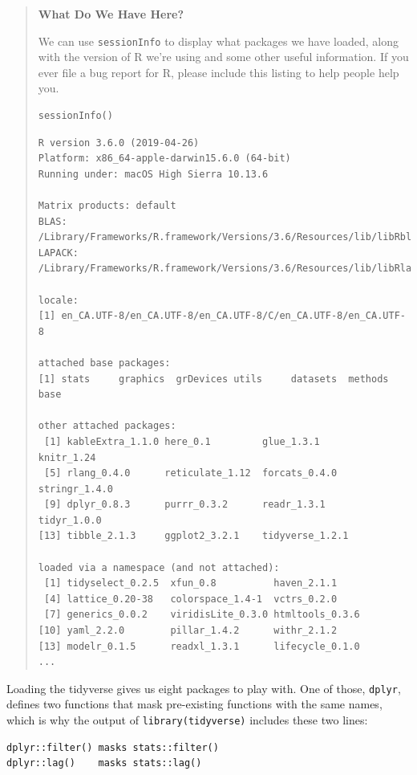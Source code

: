 \begin{quote}
\textbf{What Do We Have Here?}

We can use \texttt{sessionInfo} to display what packages we have loaded,
along with the version of R we're using and some other useful information.
If you ever file a bug report for R,
please include this listing to help people help you.

\begin{lstlisting}
sessionInfo()
\end{lstlisting}

\begin{lstlisting}
R version 3.6.0 (2019-04-26)
Platform: x86_64-apple-darwin15.6.0 (64-bit)
Running under: macOS High Sierra 10.13.6

Matrix products: default
BLAS:   /Library/Frameworks/R.framework/Versions/3.6/Resources/lib/libRblas.0.dylib
LAPACK: /Library/Frameworks/R.framework/Versions/3.6/Resources/lib/libRlapack.dylib

locale:
[1] en_CA.UTF-8/en_CA.UTF-8/en_CA.UTF-8/C/en_CA.UTF-8/en_CA.UTF-8

attached base packages:
[1] stats     graphics  grDevices utils     datasets  methods   base     

other attached packages:
 [1] kableExtra_1.1.0 here_0.1         glue_1.3.1       knitr_1.24      
 [5] rlang_0.4.0      reticulate_1.12  forcats_0.4.0    stringr_1.4.0   
 [9] dplyr_0.8.3      purrr_0.3.2      readr_1.3.1      tidyr_1.0.0     
[13] tibble_2.1.3     ggplot2_3.2.1    tidyverse_1.2.1 

loaded via a namespace (and not attached):
 [1] tidyselect_0.2.5  xfun_0.8          haven_2.1.1      
 [4] lattice_0.20-38   colorspace_1.4-1  vctrs_0.2.0      
 [7] generics_0.0.2    viridisLite_0.3.0 htmltools_0.3.6  
[10] yaml_2.2.0        pillar_1.4.2      withr_2.1.2      
[13] modelr_0.1.5      readxl_1.3.1      lifecycle_0.1.0
...
\end{lstlisting}
\end{quote}

Loading the tidyverse gives us eight packages to play with.
One of those,
\texttt{dplyr},
defines two functions that mask pre-existing functions with the same names,
which is why the output of \texttt{library(tidyverse)} includes these two lines:

\begin{lstlisting}
dplyr::filter() masks stats::filter()
dplyr::lag()    masks stats::lag()
\end{lstlisting}

